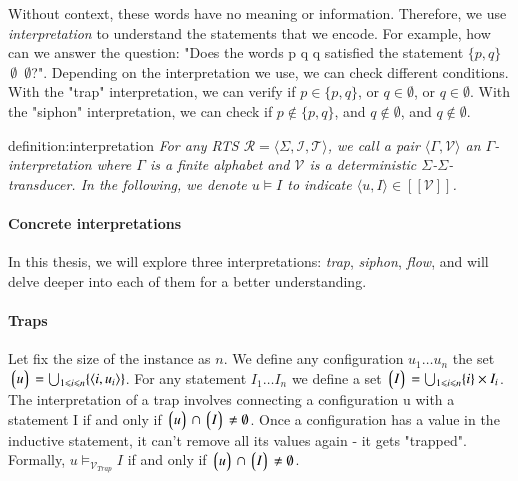 Without context, these words have no meaning or information.
Therefore, we use \textit{interpretation} to understand the statements that we encode.
For example, how can we answer the question: "Does the words p q q satisfied the statement $\lbrace p,q \rbrace$  $\,\emptyset$ $\,\emptyset$?".
Depending on the interpretation we use, we can check different conditions. 
With the "trap" interpretation, we can verify if 
$p \in \lbrace p,q \rbrace$, or $q \in \emptyset$, or $q \in \emptyset$.
With the "siphon" interpretation, we can check if
$p \notin \lbrace p,q \rbrace$, and $q \notin \emptyset$, and $q \notin \emptyset$.

\begin{theo}[Interpretation]{definition:interpretation}
    \textit{
        For any RTS $\mathcal{R} = \langle \Sigma, \mathcal{I}, \mathcal{T} \rangle$, we call 
        a pair $\langle \Gamma, \mathcal{V} \rangle$ an $\Gamma$-\textit{interpretation}
        where $\Gamma$ is a finite alphabet and $\mathcal{V}$ is a deterministic $\Sigma$-$\Sigma$-\textit{transducer}.
        In the following, we denote $ u \models I $ to indicate $ \langle u, I \rangle \in [[\mathcal{V}]]$.
     }
\end{theo}

\paragraph*{Concrete interpretations}
In this thesis, we will explore three interpretations: \textit{trap}, \textit{siphon}, \textit{flow}, 
and will delve deeper into each of them for a better understanding.

\paragraph*{Traps} 
Let fix the size of the instance as $n$. We define any configuration 
$u_1 \dots u_n$ the set $\left\lgroup u \right\rgroup = \bigcup_{1 \leqslant i \leqslant n} \lbrace\langle i, u_i \rangle \rbrace$.
For any statement $I_1 \dots I_n$ we define a set $\left\lgroup I \right\rgroup = \bigcup_{1 \leqslant i \leqslant n} \lbrace i \rbrace \times I_i$.
The interpretation of a trap involves connecting a configuration u with a statement I if and only if
$\left\lgroup u \right\rgroup \cap \left\lgroup I \right\rgroup \neq \emptyset$.
Once a configuration has a value in the inductive statement, it can't remove all its values again - 
it gets "trapped". Formally, $u \models_{\mathcal{V}_{Trap}} I$ if and only if $\left\lgroup u \right\rgroup \cap \left\lgroup I \right\rgroup \neq \emptyset$.

